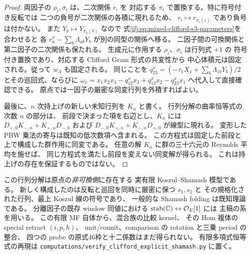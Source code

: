 \begin{proof}
両因子の $\rho_i,\sigma_i$ は、二次関係 $r_i$ を
対応する $\pi_i$ で置換する。特に符号付き反転では
二つの負号が二次関係の各積に現れるため、
$r_i\mapsto r_{\pi_i(i)}$ であり負号は付かない。
また $Y_b\mapsto Y_{\pi_2(b)}$ なので
式\eqref{ifj:eq:mixed-clifford-s3-parameters}を合わせると
各 $r^x_a-\sum_b\Lambda_{ab}Y_b$ が別の同型の関係へ移る。
二因子間の可換関係と第二因子の二次関係も保たれる。
生成元に作用する $\rho_i$、$\sigma_i$ は行列式 $+1$ の
符号付き置換であり、対応する Clifford Gram 形式の共変性から
中心体積元は固定される。従って $w_\Lambda$ も固定される。
同じことを $q^x_{23}=(-\tau_1 X_1+\sum_b\Lambda_{1b}Y_b)/2$
とその巡回式、ならびに
$\omega_x=x_1x_2x_3-q^x_{12}x_3+q^x_{13}x_2-q^x_{23}x_1$
へ代入して直接確認できる。
原点では一因子の厳密な同変行列を外積すればよい。

最後に、$n$ 次持上げの新しい未知行列を $K_n$ と書く。
行列分解の曲率恒等式の次数 $n$ の部分は、
前段で決まった項を右辺とし、$K_n$ には
$D_{+,0}K_{-,n}+K_{+,n}D_{-,0}$ および
$D_{-,0}K_{+,n}+K_{-,n}D_{+,0}$ が線型に現れる。
変形した PBW 乗法の寄与は既知の低次数項へ含まれる。
この方程式は固定した前段と上で構成した群作用に同変である。
任意の解 $K_n$ に群の三十六元の Reynolds 平均を施せば、
同じ方程式を満たし前段を変えない同変解が得られる。
これは持上げの存在を保証するものではない。
\end{proof}

\begin{remark}[明示した範囲]
この行列分解は原点の\emph{非可換側}に存在する
実有限 Koszul--Shamash 模型である。
新しく構成したのは反転と巡回を同時に厳密に保つ $s_1,s_2$ と
その規格化された行列、最上 Koszul 線の符号であり、
一般的な Shamash folding は既知理論である。
分離因子の既存 window 同値における
$\operatorname{stab}(\mathbb C)\leftrightarrow\mathcal O_E[1]$ には
主稿の系を用いる。
この有限 MF 自体から、混合族の比較 kernel、
その Hom 複体の special retract $(i,p,h)$、
unit/counit、comparison の rotation と三乗 period の整合、
四つの probe の原式46枠と十二係数はまだ得られない。
有限多項式恒等式の再現は
\texttt{computations/verify\_clifford\_explicit\_shamash.py} に置く。
\end{remark}

